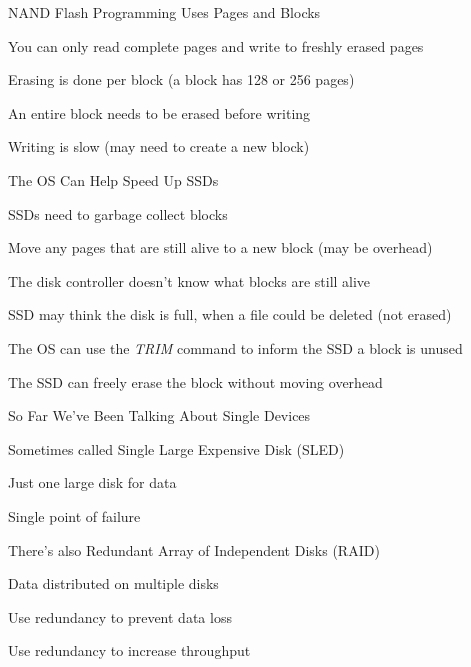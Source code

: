   \begin{frame}{NAND Flash Programming Uses Pages and Blocks}

    You can only read complete pages and write to freshly erased pages

    \vspace{2em}

    Erasing is done per block (a block has 128 or 256 pages)

    \hspace{2em} An entire block needs to be erased before writing

    \vspace{2em}

    Writing is slow (may need to create a new block)
  \end{frame}

  \begin{frame}{The OS Can Help Speed Up SSDs}

    SSDs need to garbage collect blocks

    \hspace{2em} Move any pages that are still alive to a new block (may be overhead)

    \vspace{2em}

    The disk controller doesn't know what blocks are still alive

    \hspace{2em} SSD may think the disk is full, when a file could be deleted (not erased)

    \vspace{2em}

    The OS can use the \textit{TRIM} command to inform the SSD a block is unused

    \hspace{2em} The SSD can freely erase the block without moving overhead
  \end{frame}

  \begin{frame}{So Far We've Been Talking About Single Devices}

    Sometimes called Single Large Expensive Disk (SLED)

    \hspace{2em} Just one large disk for data

    \hspace{4em} Single point of failure

    \vspace{2em}

    There's also Redundant Array of Independent Disks (RAID)

    \hspace{2em} Data distributed on multiple disks

    \hspace{4em} Use redundancy to prevent data loss

    \hspace{4em} Use redundancy to increase throughput
  \end{frame}

